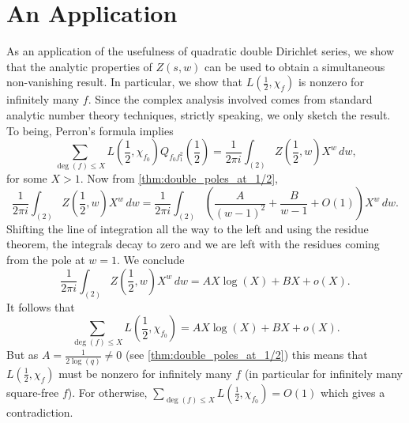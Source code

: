 \documentclass[12pt,reqno,oneside]{amsart}
\begin{document}
\section*{An Application}
    As an application of the usefulness of quadratic double Dirichlet series, we show that the analytic properties of $Z(s,w)$ can be used to obtain a simultaneous non-vanishing result. In particular, we show that $L\left(\frac{1}{2},\chi_{f}\right)$ is nonzero for infinitely many $f$. Since the complex analysis involved comes from standard analytic number theory techniques, strictly speaking, we only sketch the result. To being, Perron's formula implies
    \[
        \sum_{\deg(f) \le X}L\left(\frac{1}{2},\chi_{f_{0}}\right)Q_{f_{0}f_{1}^{2}}\left(\frac{1}{2}\right) = \frac{1}{2\pi i}\int_{(2)}Z\left(\frac{1}{2},w\right)X^{w}\,dw,
    \]
    for some $X > 1$. Now from \cref{thm:double_poles_at_1/2},
    \[
        \frac{1}{2\pi i}\int_{(2)}Z\left(\frac{1}{2},w\right)X^{w}\,dw = \frac{1}{2\pi i}\int_{(2)}\left(\frac{A}{(w-1)^{2}}+\frac{B}{w-1}+O(1)\right)X^{w}\,dw.
    \]
    Shifting the line of integration all the way to the left and using the residue theorem, the integrals decay to zero and we are left with the residues coming from the pole at $w = 1$. We conclude
    \[
        \frac{1}{2\pi i}\int_{(2)}Z\left(\frac{1}{2},w\right)X^{w}\,dw = AX\log(X)+BX+o(X).
    \]
    It follows that
    \[
        \sum_{\deg(f) \le X}L\left(\frac{1}{2},\chi_{f_{0}}\right) = AX\log(X)+BX+o(X).
    \]
    But as $A = \frac{1}{2\log(q)} \neq 0$ (see \cref{thm:double_poles_at_1/2}) this means that $L\left(\frac{1}{2},\chi_{f}\right)$ must be nonzero for infinitely many $f$ (in particular for infinitely many square-free $f$). For otherwise, $\sum_{\deg(f) \le X}L\left(\frac{1}{2},\chi_{f_{0}}\right) = O(1)$ which gives a contradiction.
\end{document}
